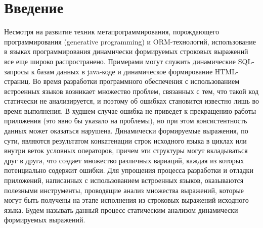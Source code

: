 \documentclass{matmex-diploma}
\begin{document}
\maketitle
\tableofcontents
\section*{Введение}
Несмотря на развитие техник метапрограммирования, порождающего программирования 
(generative programming) и ORM-технологий, использование в языках программирования 
динамически формируемых строковых выражений все еще широко распространено. 
Примерами могут служить динамические SQL-запросы к базам данных в java-коде и 
динамическое формирование HTML-страниц. Во время разработки программного обеспечения
с использованием встроенных языков возникает множество проблем, связанных с тем, 
что такой код статически не анализируется, и поэтому об ошибках становится 
известно лишь во время выполнения. В худшем случае ошибка не приведет к прекращению 
работы приложения (это явно бы указало на проблемы), но при этом консистентность 
данных может оказаться нарушена. Динамически формируемые выражения, по сути, являются 
результатом конкатенации строк исходного языка в циклах или внутри веток условных 
операторов, причем эти структуры могут вкладываться друг в друга, что создает 
множество различных вариаций, каждая из которых потенциально содержит ошибки. 
Для упрощения процесса разработки и отладки приложений, написанных с использованием 
встроенных языков, оказываются полезными инструменты, проводящие анализ множества 
выражений, которые могут быть получены на этапе исполнения из строковых выражений 
исходного языка. Будем называть данный процесс статическим анализом динамически 
формируемых выражений.
\end{document}
